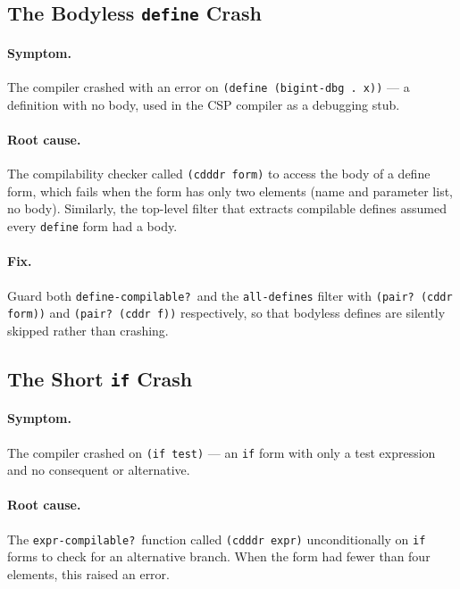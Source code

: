 \documentclass[12pt]{report}
\begin{document}
\subsection{The Bodyless \texttt{define} Crash}
\label{sec:bug-bodyless}

\paragraph{Symptom.}
The compiler crashed with an error on \texttt{(define (bigint-dbg .\ x))}
--- a definition with no body, used in the CSP compiler as a debugging
stub.

\paragraph{Root cause.}
The compilability checker called \texttt{(cdddr form)} to access the
body of a define form, which fails when the form has only two elements
(name and parameter list, no body).  Similarly, the top-level filter
that extracts compilable defines assumed every \texttt{define} form
had a body.

\paragraph{Fix.}
Guard both \texttt{define-compilable?}\ and the \texttt{all-defines}
filter with \texttt{(pair?\ (cddr form))} and
\texttt{(pair?\ (cddr f))} respectively, so that bodyless defines are
silently skipped rather than crashing.

\subsection{The Short \texttt{if} Crash}
\label{sec:bug-short-if}

\paragraph{Symptom.}
The compiler crashed on \texttt{(if test)} --- an \texttt{if} form
with only a test expression and no consequent or alternative.

\paragraph{Root cause.}
The \texttt{expr-compilable?}\ function called \texttt{(cdddr expr)}
unconditionally on \texttt{if} forms to check for an alternative
branch.  When the form had fewer than four elements, this raised an
error.
\end{document}

